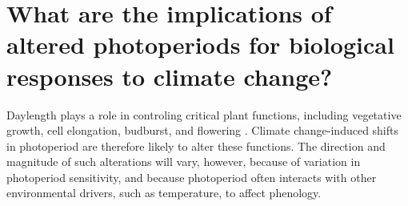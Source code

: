 \documentclass{article}
\begin{document}

\section*{What are the implications of altered photoperiods for biological responses to climate change?}
\par Daylength plays a role in controling critical plant functions, including vegetative growth, cell elongation, budburst, and flowering \citep{Linkosalo:2006aa,erwin1998,sidaway2010, Hsu:2011,Heide:2011aa,Ashby:1962aa,Heide:2012aa,mimura2007}. Climate change-induced shifts in photoperiod are therefore likely to alter these functions. The direction and magnitude of such alterations will vary, however, because of variation in photoperiod sensitivity, and because photoperiod often interacts with other environmental drivers, such as temperature, to affect phenology. 
\end{document}

